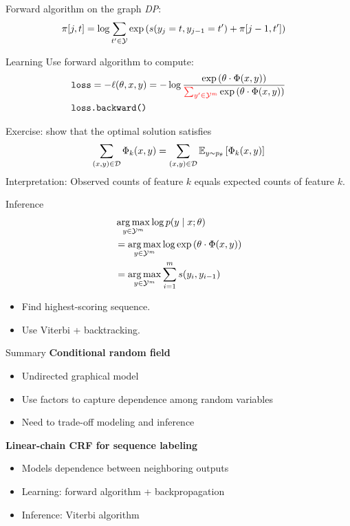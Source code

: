 \documentclass[usenames,dvipsnames,notes]{beamer}
\begin{document}
\begin{frame}
    {Forward algorithm on the graph}
    \emph{DP}:
    \begin{align*}
        \pi[j,t] &= \log\sum_{t'\in\mathcal{Y}}\exp\left(  s(y_j=t,y_{j-1}=t') + \pi[j-1,t']  \right)
    \end{align*}
    \vspace{8em}
\end{frame}

\begin{frame}
    {Learning}
    Use forward algorithm to compute:
    \begin{align*}
        &\texttt{loss} = -\ell(\theta,x,y)
    = -\log \frac{\exp\left(  \theta\cdot\Phi(x,y)  \right)}
        {{\color{red}\sum_{y'\in\mathcal{Y}^m}}  \exp\left(  \theta\cdot\Phi(x,y)  \right)}\\
        &\texttt{loss.backward()}
    \end{align*}

    Exercise: show that the optimal solution satisfies
    $$
    \sum_{(x,y)\in\mathcal{D}}\Phi_k(x,y) = \sum_{(x,y)\in\mathcal{D}}\mathbb{E}_{y\sim p_\theta}\left[ \Phi_k(x,y) \right]
    $$
    Interpretation: Observed counts of feature $k$ equals expected counts of feature $k$.
\end{frame}

\begin{frame}
    {Inference}
    \begin{align*}
    & \operatorname*{arg\,max}_{y\in\mathcal{Y}^m} \log p(y\mid x; \theta) \\
    &=\operatorname*{arg\,max}_{y\in\mathcal{Y}^m} \log \exp \left(  \theta\cdot \Phi(x,y)  \right)\\
    &=\operatorname*{arg\,max}_{y\in\mathcal{Y}^m} \sum_{i=1}^m s(y_i,y_{i-1})
    \end{align*}
    \begin{itemize}
        \item Find highest-scoring sequence.
        \item Use Viterbi + backtracking.
    \end{itemize}
\end{frame}

\begin{frame}
    {Summary}
    \textbf{Conditional random field}
    \begin{itemize}
        \item Undirected graphical model
        \item Use factors to capture dependence among random variables
        \item Need to trade-off modeling and inference
    \end{itemize}

    \textbf{Linear-chain CRF for sequence labeling}
    \begin{itemize}
        \item Models dependence between neighboring outputs
        \item Learning: forward algorithm + backpropagation
        \item Inference: Viterbi algorithm
    \end{itemize}
\end{frame}
\end{document}

